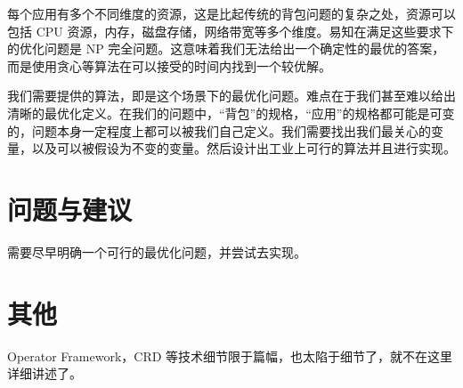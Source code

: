 每个应用有多个不同维度的资源，这是比起传统的背包问题的复杂之处，资源可以包括 CPU 资源，内存，磁盘存储，网络带宽等多个维度。易知在满足这些要求下的优化问题是 NP 完全问题。这意味着我们无法给出一个确定性的最优的答案，而是使用贪心等算法在可以接受的时间内找到一个较优解。

我们需要提供的算法，即是这个场景下的最优化问题。难点在于我们甚至难以给出清晰的最优化定义。在我们的问题中，“背包”的规格，“应用”的规格都可能是可变的，问题本身一定程度上都可以被我们自己定义。我们需要找出我们最关心的变量，以及可以被假设为不变的变量。然后设计出工业上可行的算法并且进行实现。

\section{问题与建议}

需要尽早明确一个可行的最优化问题，并尝试去实现。

\section{其他}

Operator Framework，CRD 等技术细节限于篇幅，也太陷于细节了，就不在这里详细讲述了。
